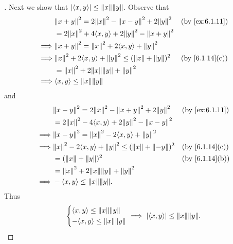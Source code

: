 \begin{proof}[]
  Next we show that \(\abs{\inn{x, y}} \leq \norm{x} \norm{y}\).
  Observe that
  \begin{align*}
             & \norm{x + y}^2 = 2 \norm{x}^2 - \norm{x - y}^2 + 2 \norm{y}^2       &  & \by{ex:6.1.11} \\
             & = 2 \norm{x}^2 + 4 \inn{x, y} + 2 \norm{y}^2 - \norm{x + y}^2                           \\
    \implies & \norm{x + y}^2 = \norm{x}^2 + 2 \inn{x, y} + \norm{y}^2                                 \\
    \implies & \norm{x}^2 + 2 \inn{x, y} + \norm{y}^2 \leq (\norm{x} + \norm{y})^2 &  & \by{6.1.14}[c] \\
             & = \norm{x}^2 + 2 \norm{x} \norm{y} + \norm{y}^2                                         \\
    \implies & \inn{x, y} \leq \norm{x} \norm{y}
  \end{align*}
  and
  \begin{align*}
             & \norm{x - y}^2 = 2 \norm{x}^2 - \norm{x + y}^2 + 2 \norm{y}^2        &  & \by{ex:6.1.11} \\
             & = 2 \norm{x}^2 - 4 \inn{x, y} + 2 \norm{y}^2 - \norm{x - y}^2                            \\
    \implies & \norm{x - y}^2 = \norm{x}^2 - 2 \inn{x, y} + \norm{y}^2                                  \\
    \implies & \norm{x}^2 - 2 \inn{x, y} + \norm{y}^2 \leq (\norm{x} + \norm{-y})^2 &  & \by{6.1.14}[c] \\
             & = (\norm{x} + \norm{y})^2                                            &  & \by{6.1.14}[b] \\
             & = \norm{x}^2 + 2 \norm{x} \norm{y} + \norm{y}^2                                          \\
    \implies & - \inn{x, y} \leq \norm{x} \norm{y}.
  \end{align*}
  Thus
  \[
    \begin{dcases}
      \inn{x, y} \leq \norm{x} \norm{y} \\
      -\inn{x, y} \leq \norm{x} \norm{y}
    \end{dcases} \implies \abs{\inn{x, y}} \leq \norm{x} \norm{y}.
  \]


\end{proof}
